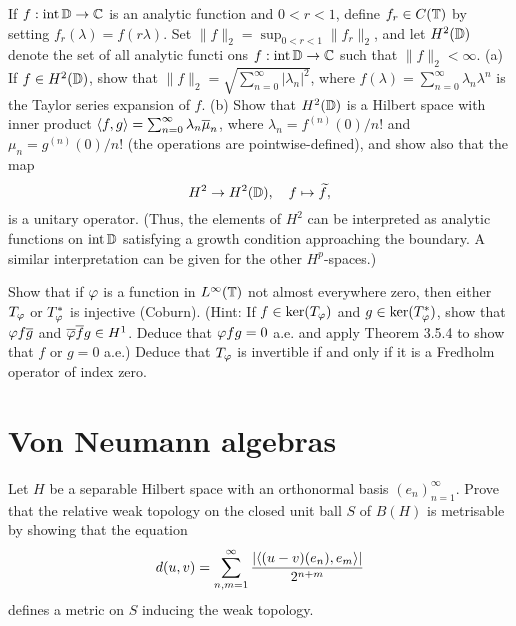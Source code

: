 \documentclass{../solution}
\begin{document}
\begin{prb}
If $f:\operatorname{int}\mathbb{D}\to\mathbb{C}$ is an analytic function and $0<r<1$, define $f_r\in C(\mathbb{T})$ by setting $f_r(\lambda)=f(r\lambda)$.
Set $\|f\|_2=\sup_{0<r<1}\|f_r\|_2$, and let $H^2(\mathbb{D})$ denote the set of all analytic functi ons $f:\operatorname{int}\mathbb{D}\to\mathbb{C}$ such that $\|f\|_2<\infty$.
(a) If $f\in H^2(\mathbb{D})$, show that $\|f\|_2=\sqrt{\sum_{n=0}^\infty|\lambda_n|^2}$, where $f(\lambda)=\sum_{n=0}^\infty\lambda_n\lambda^n$ is the Taylor series expansion of $f$.
(b) Show that $H^2(\mathbb{D})$ is a Hilbert space with inner product $\langle f,g\rangle=\sum_{n=0}^\infty\lambda_n\overline\mu_n$, where $\lambda_n=f^{(n)}(0)/n!$ and $\mu_n=g^{(n)}(0)/n!$ (the operations are pointwise-defined), and show also that the map 
\[H^2\to H^2(\mathbb{D}),\quad f\mapsto\widetilde f,\]
is a unitary operator.
(Thus, the elements of $H^2$ can be interpreted as analytic functions on $\operatorname{int}\mathbb{D}$ satisfying a growth condition approaching the boundary.
A similar interpretation can be given for the other $H^p$-spaces.)
\end{prb}
\begin{sol}
\end{sol}


\begin{prb}
Show that if $\varphi$ is a function in $L^\infty(\mathbb{T})$ not almost everywhere zero, then either $T_\varphi$ or $T_\varphi^*$ is injective (Coburn).
(Hint: If $f\in\ker(T_\varphi)$ and $g\in\ker(T_\varphi^*)$, show that $\varphi f\overline g$ and $\overline{\varphi}\overline fg\in H^1$.
Deduce that $\varphi fg=0$ a.e. and apply Theorem 3.5.4 to show that $f$ or $g=0$ a.e.)
Deduce that $T_\varphi$ is invertible if and only if it is a Fredholm operator of index zero.
\end{prb}
\begin{sol}
\end{sol}


\section{Von Neumann algebras}

\begin{prb}
Let $H$ be a separable Hilbert space with an orthonormal basis $(e_n)_{n=1}^\infty$.
Prove that the relative weak topology on the closed unit ball $S$ of $B(H)$ is metrisable by showing that the equation
\[d(u,v)=\sum_{n,m=1}^\infty\frac{|\langle(u-v)(e_n), e_m\rangle|}{2^{n+m}}\]
defines a metric on $S$ inducing the weak topology.
\end{prb}
\begin{sol}
\end{sol}
\end{document}
